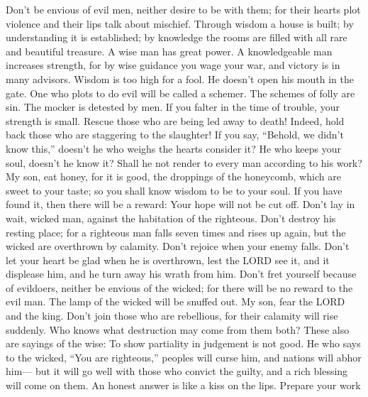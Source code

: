  Don't be envious of evil men, neither desire to be with
them;  for their hearts plot violence and their lips talk
about mischief.  Through wisdom a house is built; by
understanding it is established;  by knowledge the rooms
are filled with all rare and beautiful treasure.  A wise
man has great power. A knowledgeable man increases strength,
 for by wise guidance you wage your war, and victory is in
many advisors.  Wisdom is too high for a fool. He doesn't
open his mouth in the gate.  One who plots to do evil will
be called a schemer.  The schemes of folly are sin. The
mocker is detested by men.  If you falter in the time of
trouble, your strength is small.  Rescue those who are
being led away to death! Indeed, hold back those who are staggering to
the slaughter!  If you say, ``Behold, we didn't know
this,'' doesn't he who weighs the hearts consider it? He who keeps your
soul, doesn't he know it? Shall he not render to every man according to
his work?  My son, eat honey, for it is good, the
droppings of the honeycomb, which are sweet to your taste;
 so you shall know wisdom to be to your soul. If you have
found it, then there will be a reward: Your hope will not be cut off.
 Don't lay in wait, wicked man, against the habitation of
the righteous. Don't destroy his resting place;  for a
righteous man falls seven times and rises up again, but the wicked are
overthrown by calamity.  Don't rejoice when your enemy
falls. Don't let your heart be glad when he is overthrown,
 lest the LORD see it, and it displease him, and he turn
away his wrath from him.  Don't fret yourself because of
evildoers, neither be envious of the wicked;  for there
will be no reward to the evil man. The lamp of the wicked will be
snuffed out.  My son, fear the LORD and the king. Don't
join those who are rebellious,  for their calamity will
rise suddenly. Who knows what destruction may come from them both?
 These also are sayings of the wise: To show partiality
in judgement is not good.  He who says to the wicked,
``You are righteous,'' peoples will curse him, and nations will abhor
him---  but it will go well with those who convict the
guilty, and a rich blessing will come on them.  An honest
answer is like a kiss on the lips.  Prepare your work

